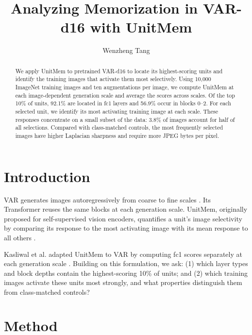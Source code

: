 \documentclass{article}
\title{Analyzing Memorization in VAR-d16 with UnitMem}
\author{Wenzheng Tang}
\begin{document}
\maketitle
\lhead{}

\begin{abstract}
We apply UnitMem to pretrained VAR-d16 to locate its highest-scoring units and
identify the training images that activate them most selectively. Using
10{,}000 ImageNet training images and ten augmentations per image, we compute
UnitMem at each image-dependent generation scale and average the scores across
scales. Of the top 10\% of units, 92.1\% are located in fc1 layers and 56.9\%
occur in blocks 0--2. For each selected unit, we identify its most activating
training image at each scale. These responses concentrate on a small subset of
the data: 3.8\% of images account for half of all selections. Compared with
class-matched controls, the most frequently selected images have higher
Laplacian sharpness and require more JPEG bytes per pixel.
\end{abstract}

\vspace{-4pt}
\section{Introduction}
\label{sec:intro}
\vspace{-2pt}

VAR generates images autoregressively from coarse to fine scales
\citep{tian2024var}. Its Transformer reuses the same blocks at each generation
scale. UnitMem, originally proposed for self-supervised vision encoders,
quantifies a unit's image selectivity by comparing its response to the most
activating image with its mean response to all others
\citep{wang2024localizing}.

Kasliwal et al. adapted UnitMem to VAR by computing fc1 scores separately at
each generation scale \citep{kasliwal2025localizing}. Building on this
formulation, we ask: (1) which layer types and block depths contain the
highest-scoring 10\% of units; and (2) which training images activate these
units most strongly, and what properties distinguish them from class-matched
controls?

\vspace{-3pt}
\section{Method}
\label{sec:method}
\vspace{-2pt}
\end{document}
